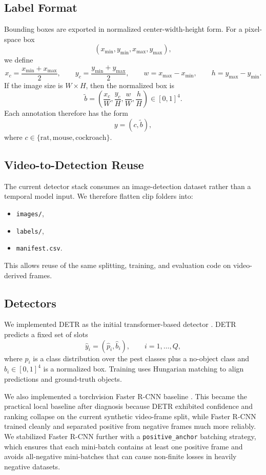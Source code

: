 \documentclass[11pt]{article}
\begin{document}
\subsection{Label Format}
Bounding boxes are exported in normalized center-width-height form. For a pixel-space box
\[
(x_{\min}, y_{\min}, x_{\max}, y_{\max}),
\]
we define
\[
x_c=\frac{x_{\min}+x_{\max}}{2}, \qquad
y_c=\frac{y_{\min}+y_{\max}}{2}, \qquad
w=x_{\max}-x_{\min}, \qquad
h=y_{\max}-y_{\min}.
\]
If the image size is $W \times H$, then the normalized box is
\[
\tilde{b}
=
\left(
\frac{x_c}{W},
\frac{y_c}{H},
\frac{w}{W},
\frac{h}{H}
\right)\in[0,1]^4.
\]
Each annotation therefore has the form
\[
y=(c,\tilde{b}),
\]
where $c \in \{\text{rat}, \text{mouse}, \text{cockroach}\}$.

\subsection{Video-to-Detection Reuse}
The current detector stack consumes an image-detection dataset rather than a temporal model input. We therefore flatten clip folders into:
\begin{itemize}[leftmargin=1.5em]
    \item \texttt{images/},
    \item \texttt{labels/},
    \item \texttt{manifest.csv}.
\end{itemize}
This allows reuse of the same splitting, training, and evaluation code on video-derived frames.

\subsection{Detectors}
We implemented DETR as the initial transformer-based detector \cite{carion2020detr}. DETR predicts a fixed set of slots
\[
\hat{y}_i=(\hat{p}_i,\hat{b}_i), \qquad i=1,\dots,Q,
\]
where $\hat{p}_i$ is a class distribution over the pest classes plus a no-object class and $\hat{b}_i \in [0,1]^4$ is a normalized box. Training uses Hungarian matching to align predictions and ground-truth objects.

We also implemented a torchvision Faster R-CNN baseline \cite{ren2015fasterrcnn}. This became the practical local baseline after diagnosis because DETR exhibited confidence and ranking collapse on the current synthetic video-frame split, while Faster R-CNN trained cleanly and separated positive from negative frames much more reliably. We stabilized Faster R-CNN further with a \texttt{positive\_anchor} batching strategy, which ensures that each mini-batch contains at least one positive frame and avoids all-negative mini-batches that can cause non-finite losses in heavily negative datasets.
\end{document}
